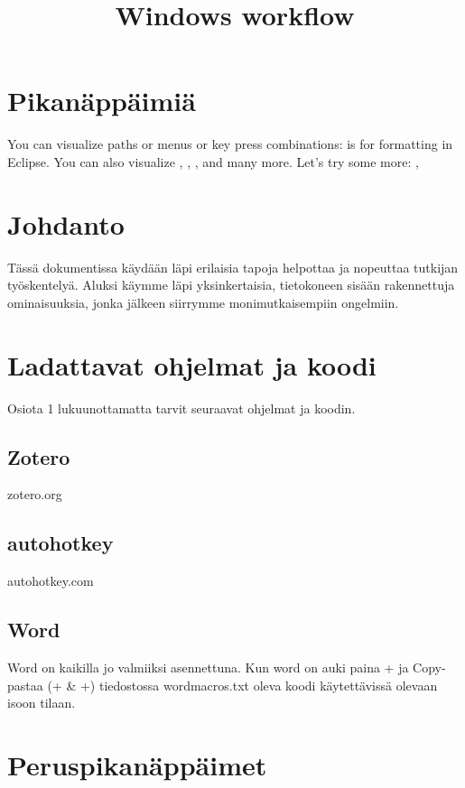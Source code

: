 \documentclass[a5paper,9pt]{scrartcl}
\title{Windows workflow}
\begin{document}
	\section{Pikanäppäimiä}
	You can visualize paths 
    or menus  or key
    press combinations:  is for formatting
    in Eclipse.
    You can also visualize \keys{\tab}, \keys{\capslock}, \keys{\Space}, 
    \keys{\arrowkeyup} and many more.
    Let's try some more: ,   
    \section{Johdanto}
    Tässä dokumentissa käydään läpi erilaisia tapoja helpottaa ja nopeuttaa tutkijan työskentelyä. Aluksi käymme läpi yksinkertaisia, tietokoneen sisään rakennettuja ominaisuuksia, jonka jälkeen siirrymme monimutkaisempiin ongelmiin.
    
    \section{Ladattavat ohjelmat ja koodi}
    Osiota 1 lukuunottamatta tarvit seuraavat ohjelmat ja koodin.
    
    \subsection{Zotero}
    zotero.org
    
    \subsection{autohotkey}
    autohotkey.com
    
    \subsection{Word}
    Word on kaikilla jo valmiiksi asennettuna. Kun word on auki paina + ja Copy-pastaa (+ \& +) tiedostossa wordmacros.txt oleva koodi käytettävissä olevaan isoon tilaan.
    
    \section{Peruspikanäppäimet}
\end{document}
